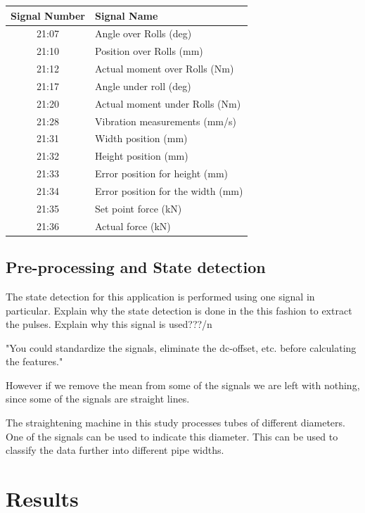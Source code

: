 \documentclass{article}
\begin{document}
\begin{center}
\begin{tabular}{ |c|l| }
 \hline
 Signal Number & Signal Name \\ 
 \hline
21:07 & Angle over Rolls (deg) \\
 \hline
21:10 & Position over Rolls (mm) \\
 \hline
21:12 & Actual moment over Rolls (Nm) \\
 \hline
21:17 & Angle under roll (deg) \\
 \hline
21:20 & Actual moment under Rolls (Nm) \\
 \hline
21:28 & Vibration measurements (mm/s) \\ 
 \hline              
21:31 & Width position (mm) \\
 \hline
21:32 & Height position (mm) \\
 \hline
21:33 & Error position for height (mm) \\
 \hline
21:34 & Error position for the width (mm) \\
 \hline
21:35 & Set point force (kN) \\
 \hline
21:36 & Actual force (kN) \\
 \hline
\end{tabular}
\label{signalNames}
\end{center}

\subsection{Pre-processing and State detection}
The state detection for this application is performed using one signal in particular. 
Explain why the state detection is done in the this fashion to extract the pulses.
Explain why this signal is used???/n

"You could standardize the signals, eliminate the dc-offset, etc. before calculating the features."

However if we remove the mean from some of the signals we are left with nothing, since some of the signals are straight lines.

The straightening machine in this study processes tubes of different diameters. One of the signals can be used to indicate this diameter. This can be used to classify the data further into different pipe widths.
\section{Results}
\end{document}
